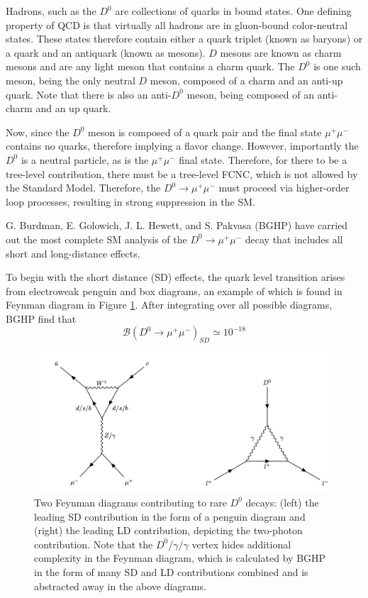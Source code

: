Hadrons, such as the $D^0$ are collections of quarks in bound states. One defining property of QCD is that virtually all hadrons are in gluon-bound color-neutral states. These states therefore contain either a quark triplet (known as baryons) or a quark and an antiquark (known as mesons). $D$ mesons are known as charm mesons and are any light meson that contains a charm quark. The $D^0$ is one such meson, being the only neutral $D$ meson, composed of a charm and an anti-up quark. Note that there is also an anti-$D^0$ meson, being composed of an anti-charm and an up quark. 

Now, since the $D^0$ meson is composed of a quark pair and the final state $\mu^+ \mu^-$ contains no quarks, therefore implying a flavor change. However, importantly the $D^0$ is a neutral particle, as is the $\mu^+ \mu^-$ final state. Therefore, for there to be a tree-level contribution, there must be a tree-level FCNC, which is not allowed by the Standard Model. Therefore, the $D^0 \to \mu^+ \mu^-$  must proceed via higher-order loop processes, resulting in strong suppression in the SM.

G. Burdman, E. Golowich, J. L. Hewett, and S. Pakvasa (BGHP) have carried out the most complete SM analysis of the $D^0 \to \mu^+ \mu^-$ decay that includes all short and long-distance effects. 

To begin with the short distance (SD) effects, the quark level transition arises from electroweak penguin and box diagrams, an example of which is found in Feynman diagram in Figure \ref{fig:D0_decay_diagrams}. After integrating over all possible diagrams, BGHP find that 
\begin{equation}
\mathcal{B}(D^0 \to \mu^+ \mu^-)_{SD} \simeq 10^{-18}
\end{equation}

\begin{figure}[ht!]
    \centering
    \includegraphics[width=1.0\textwidth]{figures/chapter2/d0_FCNC_decays.png}
    \caption{Two Feynman diagrams contributing to rare \(D^0\) decays: (left) the leading SD contribution in the form of a penguin diagram and (right) the leading LD contribution, depicting the two-photon contribution. Note that the $D^0$/$\gamma$/$\gamma$ vertex hides additional complexity in the Feynman diagram, which is calculated by BGHP in the form of many SD and LD contributions combined and is abstracted away in the above diagrams.}
  \label{fig:D0_decay_diagrams}
\end{figure}


